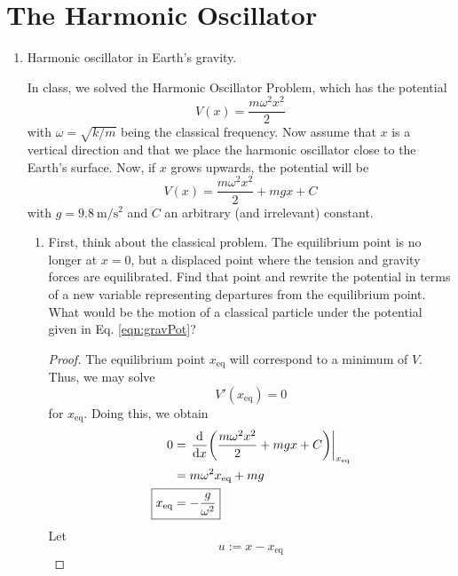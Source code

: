 \documentclass[../psets.tex]{subfiles}
\begin{document}
\section{The Harmonic Oscillator}
\begin{enumerate}
    \item {}Harmonic oscillator in Earth's gravity.\par
    In class, we solved the Harmonic Oscillator Problem, which has the potential
    \begin{equation}
        V(x) = \frac{m\omega^2x^2}{2}
    \end{equation}
    with $\omega=\sqrt{k/m}$ being the classical frequency. Now assume that $x$ is a vertical direction and that we place the harmonic oscillator close to the Earth's surface. Now, if $x$ grows upwards, the potential will be
    \begin{equation}\label{eqn:gravPot}
        V(x) = \frac{m\omega^2x^2}{2}+mgx+C
    \end{equation}
    with $g=\SI[per-mode=symbol]{9.8}{\meter\per\second\squared}$ and $C$ an arbitrary (and irrelevant) constant.
    \begin{enumerate}
        \item First, think about the classical problem. The equilibrium point is no longer at $x=0$, but a displaced point where the tension and gravity forces are equilibrated. Find that point and rewrite the potential in terms of a new variable representing departures from the equilibrium point. What would be the motion of a classical particle under the potential given in Eq. \ref{eqn:gravPot}?
        \begin{proof}
            The equilibrium point $x_\text{eq}$ will correspond to a minimum of $V$. Thus, we may solve
            \begin{equation*}
                V'(x_\text{eq}) = 0
            \end{equation*}
            for $x_\text{eq}$. Doing this, we obtain
            \begin{align*}
                0 &= \eval{\dv{x}(\frac{m\omega^2x^2}{2}+mgx+C)}_{x_\text{eq}}\\
                &= m\omega^2x_\text{eq}+mg\\
                \Aboxed{x_\text{eq} &= -\frac{g}{\omega^2}}
            \end{align*}
            Let
            \begin{equation*}
                u := x-x_\text{eq}
            \end{equation*}

\end{proof}
\end{enumerate}
\end{enumerate}
\end{document}

